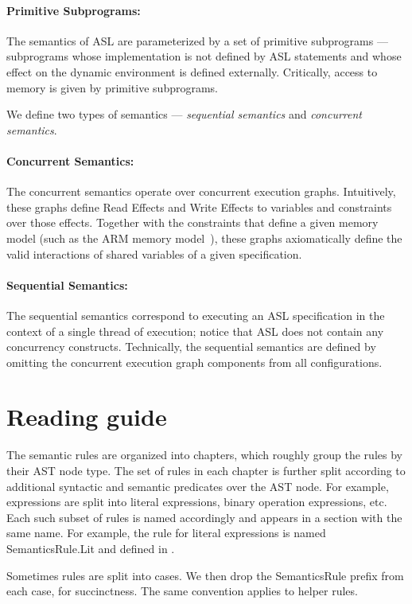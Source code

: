 \documentclass{book}
\begin{document}
\paragraph{Primitive Subprograms:}
The semantics of ASL are parameterized by a set of primitive subprograms ---
subprograms whose implementation is not defined by ASL statements and whose effect on the dynamic environment
is defined externally. Critically, access to memory is given by primitive subprograms.

We define two types of semantics --- \emph{sequential semantics} and \emph{concurrent semantics}.

\paragraph{Concurrent Semantics:}
The concurrent semantics operate over concurrent execution graphs.
Intuitively, these graphs define Read Effects and Write Effects to variables and constraints over those effects.
Together with the constraints that define a given memory model (such as the ARM memory model~\cite{AlglaveDGHM21}),
these graphs axiomatically define
the valid interactions of shared variables of a given specification.

\paragraph{Sequential Semantics:}
The sequential semantics correspond to executing an ASL specification in the context of a single thread
of execution; notice that ASL does not contain any concurrency constructs.
%
Technically, the sequential semantics are defined by omitting the concurrent execution graph components
from all configurations.

\section{Reading guide}
The semantic rules are organized into chapters, which roughly group the rules
by their AST node type.  The set of rules in each chapter is further split
according to additional syntactic and semantic predicates over the AST node.
For example, expressions are split into literal expressions, binary operation
expressions, etc.  Each such subset of rules is named accordingly and appears
in a section with the same name.  For example, the rule for literal expressions
is named SemanticsRule.Lit and defined in .

Sometimes rules are split into cases.  We then drop the SemanticsRule prefix
from each case, for succinctness.  The same convention applies to helper rules.
\end{document}
